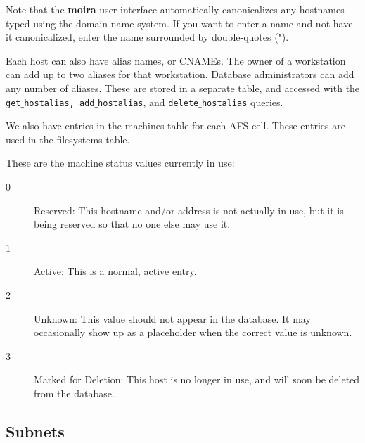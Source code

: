 \documentclass{book}
\begin{document}
Note that the {\bf moira} user interface automatically canonicalizes
any hostnames typed using the domain name system.  If you want to
enter a name and not have it canonicalized, enter the name surrounded
by double-quotes (").  

Each host can also have alias names, or CNAMEs.  The owner of a
workstation can add up to two aliases for that workstation.  Database
administrators can add any number of aliases.  These are stored in a
separate table, and accessed with the {\tt get$\_$hostalias,
add$\_$hostalias}, and {\tt delete$\_$hostalias} queries.

We also have entries in the machines table for each AFS cell.  These
entries are used in the filesystems table.

These are the machine status values currently in use:
\begin{description}
\item[0] Reserved: This hostname and/or address is not actually in
use, but it is being reserved so that no one else may use it.
\item[1] Active: This is a normal, active entry.
\item[2] Unknown: This value should not appear in the database.  It
may occasionally show up as a placeholder when the correct value is
unknown.
\item[3] Marked for Deletion: This host is no longer in use, and will
soon be deleted from the database.
\end{description}

\subsection{Subnets}
\end{document}
